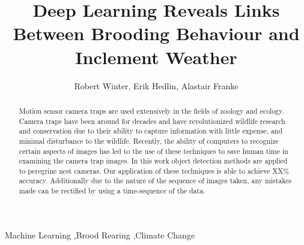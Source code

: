 \documentclass[preprint,review,12pt]{elsarticle}
\begin{document}
\begin{frontmatter}
%
\title{Deep Learning Reveals Links Between Brooding Behaviour and Inclement Weather}



\maketitle

\author{Robert Winter, Erik Hedlin, Alastair Franke}
\address{Edmonton, Alberta}



\begin{abstract}





Motion sensor camera traps are used extensively in the fields of zoology and ecology. Camera traps have been around for decades and have revolutionized wildlife research and conservation due to their ability to capture information with little expense, and minimal disturbance to the wildlife. Recently, the ability of computers to recognize certain aspects of images has led to the use of these techniques to save human time in examining the camera trap images. In this work object detection methods are applied to peregrine nest cameras. Our application of these techniques is able to achieve XX\% accuracy. Additionally due to the nature of the sequence of images taken, any mistakes made can be rectified by using a time-sequence of the data. 

\end{abstract}


\begin{keyword}
Machine Learning \sep Brood Rearing \sep Climate Change
\end{keyword}

\end{frontmatter}

\linenumbers












%


%
\end{document}
